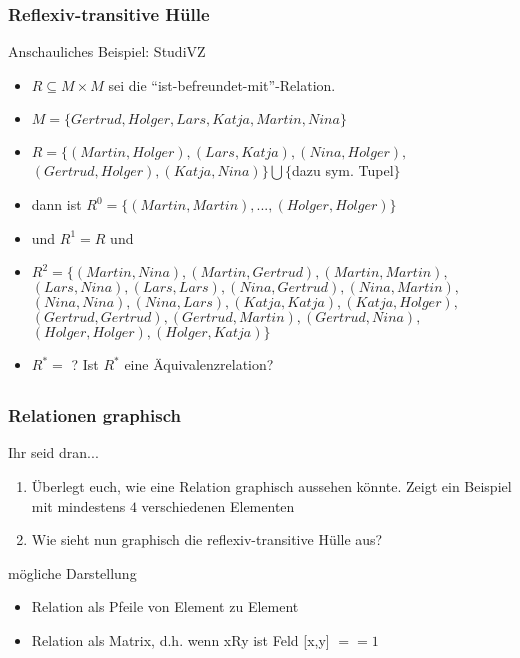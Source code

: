 \begin{frame}
	\frametitle{Reflexiv-transitive Hülle}
	\begin{block}{Anschauliches Beispiel: StudiVZ}
		\begin{itemize}
			\item $R \subseteq M \times M $ sei die "`ist-befreundet-mit"'-Relation.
			\item $M = \{ Gertrud, Holger, Lars, Katja, Martin, Nina \} $ %
			\item $R = \{ (Martin,Holger), (Lars,Katja), (Nina,Holger),$ \\
						$(Gertrud,Holger), (Katja, Nina) \} \bigcup \{${dazu sym. Tupel}$\}$ \pause
			\item dann ist $R^0=\{ (Martin,Martin), ..., (Holger,Holger) \}$
			\item und $R^1=R$ und \pause
			\item $R^2=\{ (Martin,Nina), (Martin,Gertrud), (Martin,Martin),$ \\
						$(Lars,Nina), (Lars,Lars), (Nina,Gertrud),(Nina,Martin),$ \\
						$(Nina,Nina), (Nina,Lars), (Katja,Katja), (Katja,Holger), $ \\
						$(Gertrud,Gertrud), (Gertrud,Martin), (Gertrud,Nina), $ \\
						$(Holger,Holger), (Holger,Katja)\}$
			\item $R^*=$ ? \pause Ist $R^*$ eine Äquivalenzrelation?
		\end{itemize}
	\end{block}
\end{frame}


\subsection*{}
\begin{frame}
	\frametitle{Relationen graphisch}
	\begin{block}{Ihr seid dran...}
		\begin{enumerate}
			\item Überlegt euch, wie eine Relation graphisch aussehen könnte. Zeigt ein Beispiel mit mindestens $4$ verschiedenen Elementen %
			\item Wie sieht nun graphisch die reflexiv-transitive Hülle aus?
		\end{enumerate}
	\end{block} \pause
    \begin{block}{mögliche Darstellung}
    	\begin{itemize}
          \item Relation als Pfeile von Element zu Element
          \item Relation als Matrix, d.h. wenn xRy ist Feld [x,y] $== 1$
        \end{itemize}
    \end{block}
\end{frame}



